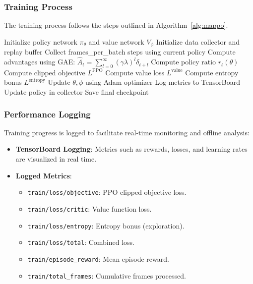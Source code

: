 \documentclass[11pt,a4paper]{article}
\begin{document}
\subsubsection{Training Process}
\label{subsubsec:training_process}

The training process follows the steps outlined in Algorithm~\ref{alg:mappo}.

\begin{algorithm}[H]
\caption{MAPPO Training Loop}
\label{alg:mappo}
\begin{algorithmic}[1]
\State Initialize policy network $\pi_\theta$ and value network $V_\phi$
\State Initialize data collector and replay buffer
    \State Collect frames\_per\_batch steps using current policy
    \State Compute advantages using GAE: $\hat{A}_t = \sum_{l=0}^{\infty} (\gamma\lambda)^l \delta_{t+l}$
            \State Compute policy ratio $r_t(\theta)$
            \State Compute clipped objective $L^{\text{PPO}}$
            \State Compute value loss $L^{\text{value}}$
            \State Compute entropy bonus $L^{\text{entropy}}$
            \State Update $\theta, \phi$ using Adam optimizer
        \EndFor
    \EndFor
    \State Log metrics to TensorBoard
    \State Update policy in collector
\EndFor
\State Save final checkpoint
\end{algorithmic}
\end{algorithm}

\subsubsection{Performance Logging}
\label{subsubsec:logging}

Training progress is logged to facilitate real-time monitoring and offline analysis:

\begin{itemize}
    \item \textbf{TensorBoard Logging}: Metrics such as rewards, losses, and learning rates are visualized in real time.

    \item \textbf{Logged Metrics}:
    \begin{itemize}
        \item \texttt{train/loss/objective}: PPO clipped objective loss.
        \item \texttt{train/loss/critic}: Value function loss.
        \item \texttt{train/loss/entropy}: Entropy bonus (exploration).
        \item \texttt{train/loss/total}: Combined loss.
        \item \texttt{train/episode\_reward}: Mean episode reward.
        \item \texttt{train/total\_frames}: Cumulative frames processed.
    \end{itemize}
\end{itemize}
\end{document}
